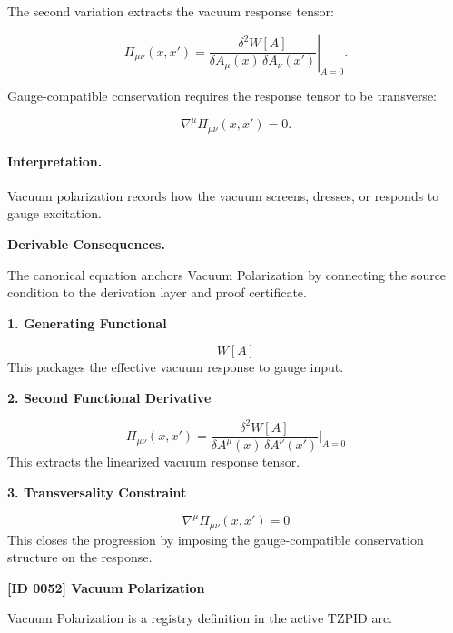 The second variation extracts the vacuum response tensor:

\begin{equation}
\Pi_{\mu\nu}(x,x')
=
\left.
\frac{\delta^2 W[A]}
{\delta A_\mu(x)\,\delta A_\nu(x')}
\right|_{A=0}.
\end{equation}

Gauge-compatible conservation requires the response tensor to be transverse:

\begin{equation}
\nabla^\mu \Pi_{\mu\nu}(x,x')=0 .
\end{equation}

\paragraph{Interpretation.}
Vacuum polarization records how the vacuum screens, dresses, or responds to gauge excitation.

\par\vspace{0.35em}
\noindent\textbf{Derivable Consequences.}\quad
\begingroup
\footnotesize
\raggedright
The canonical equation anchors Vacuum Polarization by connecting the source condition to the derivation layer and proof certificate.
\par\endgroup

\noindent\textbf{1. Generating Functional}\par
\[
W[A]
\]
\noindent This packages the effective vacuum response to gauge input.\par
\noindent\textbf{2. Second Functional Derivative}\par
\[
\Pi_{\mu\nu}(x,x')
=
\frac{\delta^{2}W[A]}{\delta A^{\mu}(x)\,\delta A^{\nu}(x')}
\biggr\rvert_{A=0}
\]
\noindent This extracts the linearized vacuum response tensor.\par
\noindent\textbf{3. Transversality Constraint}\par
\[
\nabla^{\mu}\Pi_{\mu\nu}(x,x') = 0
\]
\noindent This closes the progression by imposing the gauge-compatible conservation structure on the response.\par

\clearpage
\noindent\textbf{[ID 0052] Vacuum Polarization}\par
\vspace{0.35em}
\begingroup\small
{}
Vacuum Polarization is a registry definition in the active TZPID arc.

